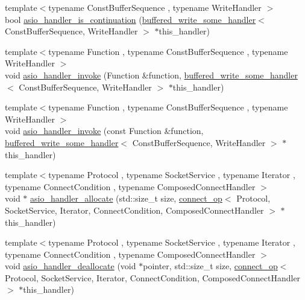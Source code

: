\begin{DoxyCompactItemize}
\item 
{\footnotesize template$<$typename Const\+Buffer\+Sequence , typename Write\+Handler $>$ }\\bool \hyperlink{namespaceasio_1_1detail_ac24bfca72812c7ee8c4a90b3003033c7}{asio\+\_\+handler\+\_\+is\+\_\+continuation} (\hyperlink{classasio_1_1detail_1_1buffered__write__some__handler}{buffered\+\_\+write\+\_\+some\+\_\+handler}$<$ Const\+Buffer\+Sequence, Write\+Handler $>$ $\ast$this\+\_\+handler)
\item 
{\footnotesize template$<$typename Function , typename Const\+Buffer\+Sequence , typename Write\+Handler $>$ }\\void \hyperlink{namespaceasio_1_1detail_af24360431b6bb5408e71b8752de50148}{asio\+\_\+handler\+\_\+invoke} (Function \&function, \hyperlink{classasio_1_1detail_1_1buffered__write__some__handler}{buffered\+\_\+write\+\_\+some\+\_\+handler}$<$ Const\+Buffer\+Sequence, Write\+Handler $>$ $\ast$this\+\_\+handler)
\item 
{\footnotesize template$<$typename Function , typename Const\+Buffer\+Sequence , typename Write\+Handler $>$ }\\void \hyperlink{namespaceasio_1_1detail_a89620b2bb73d8e51008e662385aca80d}{asio\+\_\+handler\+\_\+invoke} (const Function \&function, \hyperlink{classasio_1_1detail_1_1buffered__write__some__handler}{buffered\+\_\+write\+\_\+some\+\_\+handler}$<$ Const\+Buffer\+Sequence, Write\+Handler $>$ $\ast$this\+\_\+handler)
\item 
{\footnotesize template$<$typename Protocol , typename Socket\+Service , typename Iterator , typename Connect\+Condition , typename Composed\+Connect\+Handler $>$ }\\void $\ast$ \hyperlink{namespaceasio_1_1detail_a0b5520fe5b65e503899001ee14f5d414}{asio\+\_\+handler\+\_\+allocate} (std\+::size\+\_\+t size, \hyperlink{classasio_1_1detail_1_1connect__op}{connect\+\_\+op}$<$ Protocol, Socket\+Service, Iterator, Connect\+Condition, Composed\+Connect\+Handler $>$ $\ast$this\+\_\+handler)
\item 
{\footnotesize template$<$typename Protocol , typename Socket\+Service , typename Iterator , typename Connect\+Condition , typename Composed\+Connect\+Handler $>$ }\\void \hyperlink{namespaceasio_1_1detail_a59d343446d1ade1368014316091ef441}{asio\+\_\+handler\+\_\+deallocate} (void $\ast$pointer, std\+::size\+\_\+t size, \hyperlink{classasio_1_1detail_1_1connect__op}{connect\+\_\+op}$<$ Protocol, Socket\+Service, Iterator, Connect\+Condition, Composed\+Connect\+Handler $>$ $\ast$this\+\_\+handler)

\end{DoxyCompactItemize}
